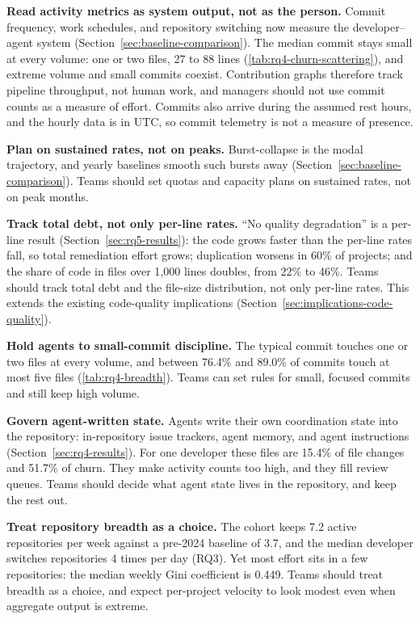 \textbf{Read activity metrics as system output, not as the person.}
Commit frequency, work schedules, and repository switching now measure the
developer--agent system (Section~\ref{sec:baseline-comparison}).
The median commit stays small at every volume: one or two files, 27 to 88 lines
(\autoref{tab:rq4-churn-scattering}), and extreme volume and small commits
coexist.
Contribution graphs therefore track pipeline throughput, not human work, and
managers should not use commit counts as a measure of effort.
Commits also arrive during the assumed rest hours, and the hourly data is in
UTC, so commit telemetry is not a measure of presence.

\textbf{Plan on sustained rates, not on peaks.}
Burst-collapse is the modal trajectory, and yearly baselines smooth such bursts
away (Section~\ref{sec:baseline-comparison}).
Teams should set quotas and capacity plans on sustained rates, not on peak
months.

\textbf{Track total debt, not only per-line rates.}
``No quality degradation'' is a per-line result (Section~\ref{sec:rq5-results}):
the code grows faster than the per-line rates fall, so total remediation effort
grows; duplication worsens in 60\% of projects; and the share of code in files
over 1{,}000 lines doubles, from 22\% to 46\%.
Teams should track total debt and the file-size distribution, not only per-line
rates.
This extends the existing code-quality implications
(Section~\ref{sec:implications-code-quality}).

\textbf{Hold agents to small-commit discipline.}
The typical commit touches one or two files at every volume, and between 76.4\%
and 89.0\% of commits touch at most five files (\autoref{tab:rq4-breadth}).
Teams can set rules for small, focused commits and still keep high volume.

\textbf{Govern agent-written state.}
Agents write their own coordination state into the repository: in-repository
issue trackers, agent memory, and agent instructions
(Section~\ref{sec:rq4-results}).
For one developer these files are 15.4\% of file changes and 51.7\% of churn.
They make activity counts too high, and they fill review queues.
Teams should decide what agent state lives in the repository, and keep the rest
out.

\textbf{Treat repository breadth as a choice.}
The cohort keeps 7.2 active repositories per week against a pre-2024 baseline of
3.7, and the median developer switches repositories 4 times per day (RQ3).
Yet most effort sits in a few repositories: the median weekly Gini coefficient
is 0.449.
Teams should treat breadth as a choice, and expect per-project velocity to look
modest even when aggregate output is extreme.


